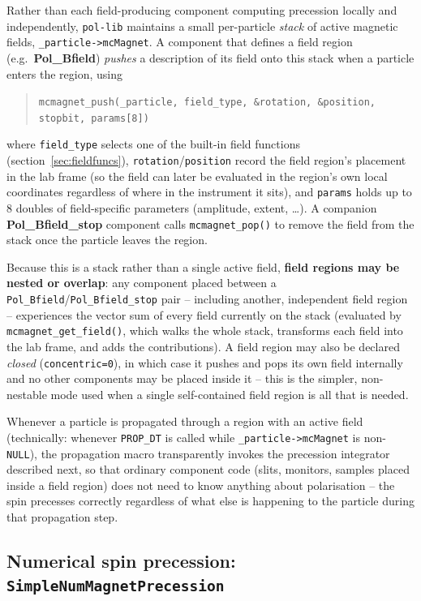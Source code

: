 Rather than each field-producing component computing precession locally and
independently, \texttt{pol-lib} maintains a small per-particle \emph{stack}
of active magnetic fields, \texttt{\_particle->mcMagnet}. A component that
defines a field region (e.g.\ \textbf{Pol\_Bfield}) \emph{pushes} a
description of its field onto this stack when a particle enters the region,
using
\begin{quote}
\texttt{mcmagnet\_push(\_particle, field\_type, \&rotation, \&position, stopbit, params[8])}
\end{quote}
where \texttt{field\_type} selects one of the built-in field functions
(section~\ref{sec:fieldfuncs}), \texttt{rotation}/\texttt{position} record
the field region's placement in the lab frame (so the field can later be
evaluated in the region's own local coordinates regardless of where in the
instrument it sits), and \texttt{params} holds up to 8 doubles of
field-specific parameters (amplitude, extent, \ldots). A companion
\textbf{Pol\_Bfield\_stop} component calls \texttt{mcmagnet\_pop()} to
remove the field from the stack once the particle leaves the region.

Because this is a stack rather than a single active field, \textbf{field
regions may be nested or overlap}: any component placed between a
\texttt{Pol\_Bfield}/\texttt{Pol\_Bfield\_stop} pair -- including another,
independent field region -- experiences the vector sum of every field
currently on the stack (evaluated by \texttt{mcmagnet\_get\_field()}, which
walks the whole stack, transforms each field into the lab frame, and adds
the contributions). A field region may also be declared \emph{closed}
(\texttt{concentric=0}), in which case it pushes and pops its own field
internally and no other components may be placed inside it -- this is the
simpler, non-nestable mode used when a single self-contained field region
is all that is needed.

Whenever a particle is propagated through a region with an active field
(technically: whenever \texttt{PROP\_DT} is called while
\texttt{\_particle->mcMagnet} is non-\texttt{NULL}), the propagation macro
transparently invokes the precession integrator described next, so that
ordinary component code (slits, monitors, samples placed inside a field
region) does not need to know anything about polarisation -- the spin
precesses correctly regardless of what else is happening to the particle
during that propagation step.

\subsection{Numerical spin precession: \texttt{SimpleNumMagnetPrecession}}
\label{sec:numprecession}

